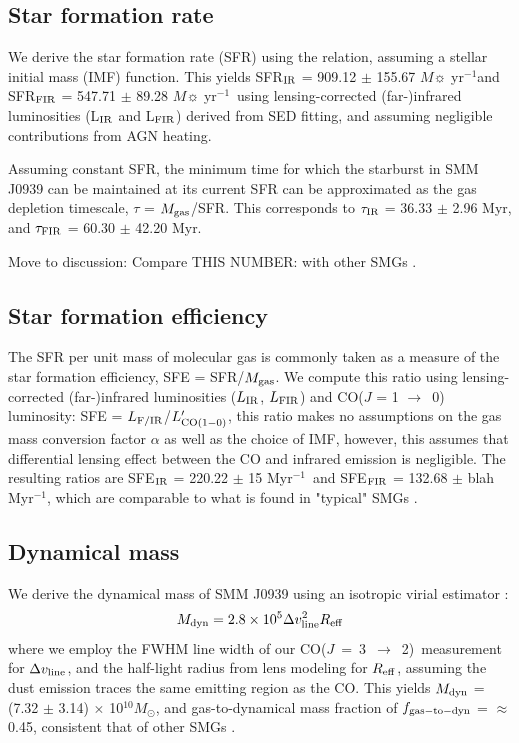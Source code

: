 \documentclass[twocolumn,apj,numberedappendix]{emulateapj}
\newcommand{\Msun}{\mbox{$M_{\odot}$}}
\newcommand{\rarr}{$\rightarrow$}
\newcommand{\CO}{\mbox{CO($J$ = 3 $\rightarrow$ 2) }}
\newcommand{\Lp}{\mbox{$L^{\prime}_{\rm CO(1-0)}$}}
\newcommand{\eg}{{\sl e.g.,~}}
\newcommand{\pmOne}{$^{-1}$}
\begin{document}
\subsection{Star formation rate}
We derive the star formation rate (SFR) using the \citet{Kennicutt98a} relation, assuming a \citet{Chabrier03a}
stellar initial mass (IMF) function. This yields SFR$_{\rm IR}$ 
= 909.12 $\pm$ 155.67 $M\sun$ yr\pmOne and SFR$_{\rm FIR}$ = 547.71 $\pm$ 89.28 $M
\sun$ yr\pmOne\ using lensing-corrected (far-)infrared luminosities (L$_{\rm IR}$ and L$_{\rm FIR}$) derived from SED 
fitting, and assuming negligible contributions from AGN heating.

Assuming constant SFR, the minimum time for which the starburst in SMM J0939 can be maintained at its
current SFR can be approximated as the gas depletion timescale, $\tau$ = $M_{\rm gas}$/SFR. 
This corresponds to $\tau_{\rm IR}$ = 36.33 $\pm$ 2.96 Myr, and $\tau_{\rm FIR}$ = 60.30 $\pm$ 42.20 Myr.

Move to discussion: Compare THIS NUMBER: with other SMGs \citep[\eg][]{Greve05a}. 

\subsection{Star formation efficiency}
The SFR per unit mass of molecular gas is commonly taken as a
measure of the star formation efficiency, SFE = SFR/$M_{\rm gas}$. We compute this ratio using lensing-corrected (far-)infrared 
luminosities ($L_{\rm IR}$, $L_{\rm FIR}$) and CO($J$ = 1 \rarr\ 0) luminosity: SFE = $L_{\rm F/IR}$/\Lp, this ratio makes no assumptions on the gas mass conversion factor $\alpha$ as well as the 
choice of IMF, however, this assumes that differential lensing effect between the CO and infrared emission is negligible. 
The resulting ratios are SFE$_{\rm IR}$ = 220.22 $\pm$ 15 Myr\pmOne\ and SFE$_{\rm FIR}$ = 132.68 $\pm$ blah Myr\pmOne, which are comparable
to what is found in "typical" SMGs \citep{Riechers10, Tacconi06, Greve05a}.

\subsection{Dynamical mass} 
We derive the dynamical mass of SMM J0939 using an isotropic virial estimator \citep[\eg][]{Engel10a}:
\begin{equation}
M_{\rm dyn} = 2.8\times 10^5\Delta v_{\rm line}^ 2 R_{\rm eff}
\end{equation}
where we employ the FWHM line width of our \CO measurement for $\Delta v_{\rm line}$,
and the half-light radius from lens modeling for $R_{\rm eff}$, assuming the dust emission traces the same emitting region as the CO. This yields $M_{\rm dyn}$ = (7.32 $\pm$ 3.14) $\times$ 10$^{10}$\Msun , and gas-to-dynamical mass fraction of $f_{\rm gas-to-dyn}$ = $\approx$ 0.45, consistent that of other SMGs \citep{Greve06a,Tacconi06a}.
\end{document}
